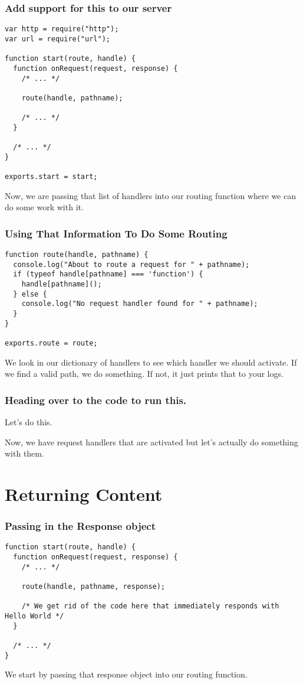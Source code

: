 \documentclass[ignorenonframetext,]{beamer}
\begin{document}
\begin{frame}[fragile]\frametitle{Add support for this to our server}

\begin{verbatim}
var http = require("http");
var url = require("url");

function start(route, handle) {
  function onRequest(request, response) {
    /* ... */

    route(handle, pathname);

    /* ... */
  }

  /* ... */
}

exports.start = start;
\end{verbatim}
Now, we are passing that list of handlers into our routing function
where we can do some work with it.

\end{frame}

\begin{frame}[fragile]\frametitle{Using That Information To Do Some
Routing}

\begin{verbatim}
function route(handle, pathname) {
  console.log("About to route a request for " + pathname);
  if (typeof handle[pathname] === 'function') {
    handle[pathname]();
  } else {
    console.log("No request handler found for " + pathname);
  }
}

exports.route = route;
\end{verbatim}
We look in our dictionary of handlers to see which handler we should
activate. If we find a valid path, we do something. If not, it just
prints that to your logs.

\end{frame}

\begin{frame}\frametitle{Heading over to the code to run this.}

Let's do this.

Now, we have request handlers that are activated but let's actually do
something with them.

\end{frame}

\section{Returning Content}

\begin{frame}[fragile]\frametitle{Passing in the Response object}

\begin{verbatim}
function start(route, handle) {
  function onRequest(request, response) {
    /* ... */

    route(handle, pathname, response);

    /* We get rid of the code here that immediately responds with Hello World */
  }

  /* ... */
}
\end{verbatim}
We start by passing that response object into our routing function.

\end{frame}
\end{document}
